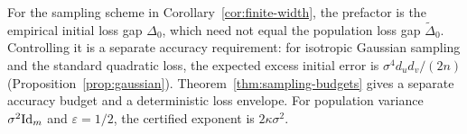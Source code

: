 For the sampling scheme in Corollary~\ref{cor:finite-width}, the prefactor is
the empirical initial loss gap $\Delta_0$, which need not equal the population
loss gap $\widetilde\Delta_0$. Controlling it is a separate
accuracy requirement: for isotropic Gaussian sampling and the standard quadratic loss,
the expected excess initial error is $\sigma^4d_ud_v/(2n)$
(Proposition~\ref{prop:gaussian}). Theorem~\ref{thm:sampling-budgets}
gives a separate accuracy budget and a deterministic loss envelope.
For population variance $\sigma^2 \mathrm{Id}_m$ and $\varepsilon=1/2$,
the certified exponent is $2\kappa\sigma^2$.

